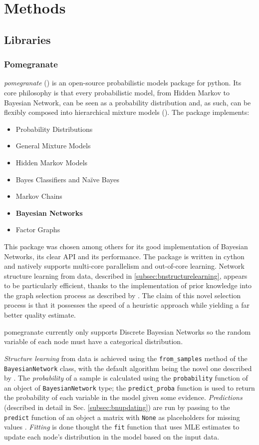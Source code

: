 
\section{Methods} 
\subsection{Libraries}
\subsubsection{Pomegranate}
\textit{pomegranate} (\cite{pomegranate}) is an open-source probabilistic models package for python.
Its core philosophy is that every probabilistic model, from Hidden Markov to Bayesian Network, can be seen as a probability distribution and, as such, can be flexibly composed into hierarchical mixture models (\cite{Schreiber2017}).
The package implements:
\begin{itemize}
	\item Probability Distributions
	\item General Mixture Models
	\item Hidden Markov Models
	\item Bayes Classifiers and Na{\"i}ve Bayes
	\item Markov Chains
	\item \textbf{Bayesian Networks}
	\item Factor Graphs
\end{itemize} 

This package was chosen among others for its good implementation of Bayesian Networks, its clear API and its performance.
The package is written in cython and natively supports multi-core parallelism and out-of-core learning.
Network structure learning from data, described in \ref{subsec:bnstructurelearning}, appears to be particularly efficient, thanks to the implementation of prior knowledge into the graph selection process as described by \cite{schreiber_noble_2017}.
The claim of this novel selection process is that it possesses the speed of a heuristic approach while yielding a far better quality estimate.

pomegranate currently only supports Discrete Bayesian Networks so the random variable of each node must have a categorical distribution.

\textit{Structure learning} from data is achieved using the \texttt{from\_samples} method of the \texttt{BayesianNetwork} class, with the default algorithm being the novel one described by \cite{schreiber_noble_2017}.
The \textit{probability} of a sample is calculated using the \texttt{probability} function of an object of \texttt{BayesianNetwork} type; the \texttt{predict\_proba} function is used to return the probability of each variable in the model given some evidence.
\textit{Predictions} (described in detail in Sec. \ref{subsec:bnupdating}) are run by passing to the \texttt{predict} function of an object a matrix with \texttt{None} as placeholders for missing values .
\textit{Fitting} is done thought the \texttt{fit} function that uses MLE estimates to update each node's distribution in the model based on the input data.


